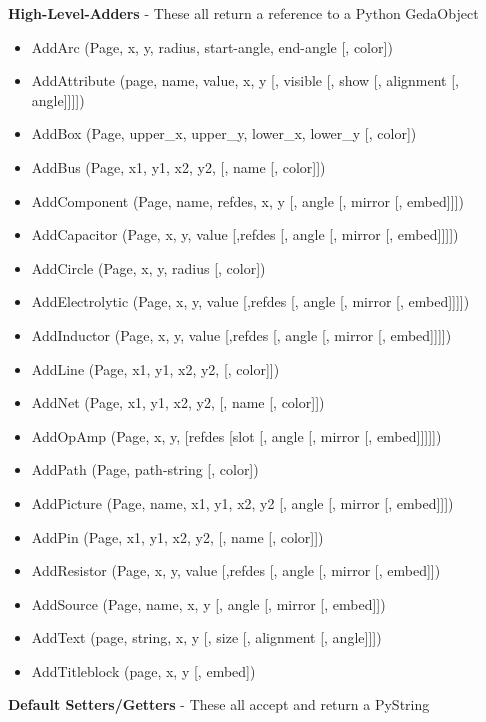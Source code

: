 \textbf{High-Level-Adders}
 - These all return a reference to a Python GedaObject 

 \begin{itemize}
\item AddArc (Page, x, y, radius, start-angle, end-angle [, color])
\item AddAttribute (page, name, value, x, y [, visible [, show [, alignment [, angle]]]])
\item AddBox (Page, upper\_x, upper\_y, lower\_x, lower\_y [, color])
\item AddBus (Page, x1, y1, x2, y2, [, name [, color]])
\item AddComponent (Page, name, refdes, x, y [, angle [, mirror [, embed]]]) 
\item AddCapacitor (Page, x, y, value [,refdes [, angle [, mirror [, embed]]]])
\item AddCircle (Page, x, y, radius [, color])
\item AddElectrolytic (Page, x, y, value [,refdes [, angle [, mirror [, embed]]]])
\item AddInductor (Page, x, y, value [,refdes [, angle [, mirror [, embed]]]])
\item AddLine (Page, x1, y1, x2, y2, [, color]])
\item AddNet (Page, x1, y1, x2, y2, [, name [, color]])
\item AddOpAmp (Page, x, y, [refdes [slot [, angle [, mirror [, embed]]]]])
\item AddPath (Page, path-string [, color])
\item AddPicture (Page, name, x1, y1, x2, y2 [, angle [, mirror [, embed]]])
\item AddPin (Page, x1, y1, x2, y2, [, name [, color]])
\item AddResistor (Page, x, y, value [,refdes [, angle [, mirror [, embed]])
\item AddSource (Page, name, x, y [, angle [, mirror [, embed]])
\item AddText (page, string, x, y [, size [, alignment [, angle]]])
\item AddTitleblock (page, x, y [, embed])

\end{itemize}


 \textbf{Default Setters/Getters}
 - These all accept and return a PyString 


